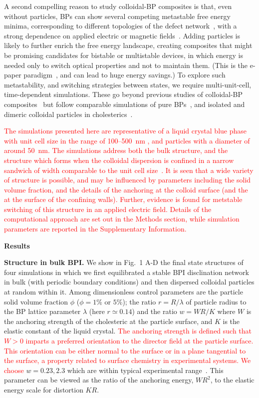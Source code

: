\documentclass[12pt]{article}
\begin{document}
A second compelling reason to study colloidal-BP composites is that, even without particles, BPs can show several competing metastable free energy minima,
corresponding to different topologies of the defect network~\cite{adriano,fukuda}, with a strong dependence on applied electric or magnetic fields~\cite{henrichfield}.
% 
Adding particles is likely to further enrich the free energy landscape, creating composites that might be promising candidates for bistable or multistable devices, in which energy is needed only to switch optical properties and not to maintain them. (This is the e-paper paradigm~\cite{epaper}, and can lead to huge energy savings.)
To explore such metastability, and switching strategies between states, we require multi-unit-cell, time-dependent simulations. These go beyond previous studies of colloidal-BP composites~\cite{miha} but follow comparable simulations of pure BPs~\cite{bp3,henrichfield,domaingrowth}, and isolated and dimeric colloidal particles in cholesterics~\cite{juho1,juho2}.

\textcolor{red}{
The simulations presented here are representative of a liquid crystal
blue phase with unit cell size in the range of 100--500~nm \cite{mermin},
and particles with a diameter of around 50~nm. The simulations
address both the bulk structure, and the structure which forms when
the colloidal dispersion is confined in a narrow sandwich of width
comparable to the unit cell size~\cite{extrareference2}. It is seen
that a wide variety of structure is possible, and may be influenced
by parameters including the solid volume fraction, and the details
of the anchoring at the colloid surface (and the at the surface of the
confining walls). Further, evidence is found for metstable switching of
this structure in an applied electric field. Details of the
computational approach are set out in the Methods section, while
simulation parameters are reported in the Supplementary Information.
}

\bigskip
\noindent
\textbf{\large Results}

\noindent
\textbf{Structure in bulk BPI.}
We show in Fig.~1 A-D the final state structures of four simulations in which we first equilibrated a stable BPI disclination network in bulk (with periodic boundary conditions) and then dispersed colloidal particles at random within it. Among dimensionless control parameters are the particle solid volume fraction $\phi$  ($\phi = 1\%$ or $5\%$); the ratio $r = R/\lambda$ of particle radius to the BP lattice parameter $\lambda$ (here $r\simeq 0.14$) and the ratio $w = WR/K$ where $W$ is the anchoring strength of the cholesteric at the particle surface, and $K$ is the elastic constant of the liquid crystal.
\textcolor{red}{
The anchoring strength is defined such that $W > 0$ imparts a preferred
orientation to the director field at the particle surface. This orientation
can be either normal to the surface or in a plane tangential to the surface,
a property related to surface chemistry in experimental systems.%
We choose} $w = 0.23, 2.3$ which are within typical experimental range~\cite{tiffany}. This parameter can be viewed as the ratio of the anchoring energy, $WR^2$, to the elastic energy scale for distortion $KR$. 
\end{document}
